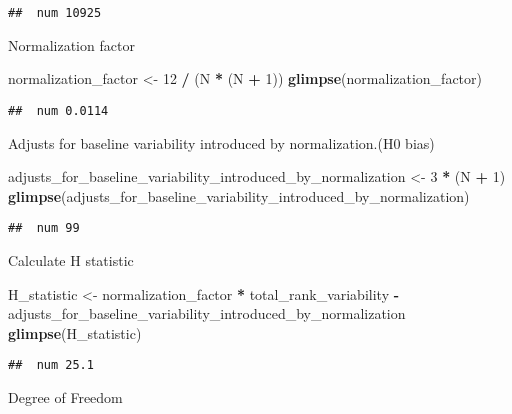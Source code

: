\documentclass[
]{article}
\newenvironment{Shaded}{\begin{snugshade}}{\end{snugshade}}
\newcommand{\DecValTok}[1]{\textcolor[rgb]{0.00,0.00,0.81}{#1}}
\newcommand{\FunctionTok}[1]{\textcolor[rgb]{0.13,0.29,0.53}{\textbf{#1}}}
\newcommand{\NormalTok}[1]{#1}
\newcommand{\OtherTok}[1]{\textcolor[rgb]{0.56,0.35,0.01}{#1}}
\newcommand{\SpecialCharTok}[1]{\textcolor[rgb]{0.81,0.36,0.00}{\textbf{#1}}}
\begin{document}
\begin{verbatim}
##  num 10925
\end{verbatim}

Normalization factor

\begin{Shaded}
\begin{Highlighting}[]
\NormalTok{normalization\_factor }\OtherTok{\textless{}{-}} \DecValTok{12} \SpecialCharTok{/}\NormalTok{ (N }\SpecialCharTok{*}\NormalTok{ (N }\SpecialCharTok{+} \DecValTok{1}\NormalTok{))}
\FunctionTok{glimpse}\NormalTok{(normalization\_factor)}
\end{Highlighting}
\end{Shaded}

\begin{verbatim}
##  num 0.0114
\end{verbatim}

Adjusts for baseline variability introduced by normalization.(H0 bias)

\begin{Shaded}
\begin{Highlighting}[]
\NormalTok{adjusts\_for\_baseline\_variability\_introduced\_by\_normalization }\OtherTok{\textless{}{-}} \DecValTok{3} \SpecialCharTok{*}\NormalTok{ (N }\SpecialCharTok{+} \DecValTok{1}\NormalTok{)}
\FunctionTok{glimpse}\NormalTok{(adjusts\_for\_baseline\_variability\_introduced\_by\_normalization)}
\end{Highlighting}
\end{Shaded}

\begin{verbatim}
##  num 99
\end{verbatim}

Calculate H statistic

\begin{Shaded}
\begin{Highlighting}[]
\NormalTok{H\_statistic }\OtherTok{\textless{}{-}}\NormalTok{ normalization\_factor }\SpecialCharTok{*}\NormalTok{ total\_rank\_variability }\SpecialCharTok{{-}}\NormalTok{ adjusts\_for\_baseline\_variability\_introduced\_by\_normalization}
\FunctionTok{glimpse}\NormalTok{(H\_statistic)}
\end{Highlighting}
\end{Shaded}

\begin{verbatim}
##  num 25.1
\end{verbatim}

Degree of Freedom
\end{document}
